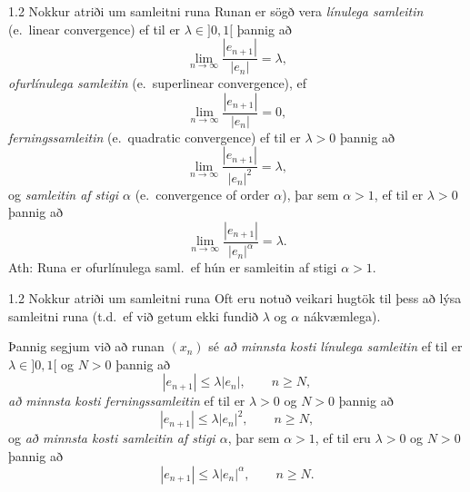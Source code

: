 %
\begin{frame}{1.2 Nokkur atriði um samleitni runa} 
Runan er sögð vera {\it  línulega samleitin} (e.~linear convergence) ef til er $\lambda\in ]0,1[$ þannig að
\begin{equation*}
	\lim_{n\to \infty}\dfrac{|e_{n+1}|}{|e_n|}=\lambda,
\end{equation*}\pause
{\it ofurlínulega samleitin} (e.~superlinear convergence), ef 
\begin{equation*}
	\lim_{n\to \infty}\dfrac{|e_{n+1}|}{|e_n|}=0,
\end{equation*}\pause
{\it ferningssamleitin} (e.~quadratic convergence) ef til er $\lambda>0$ þannig að
\begin{equation*}
	\lim_{n\to \infty}\dfrac{|e_{n+1}|}{|e_n|^2}=\lambda,
\end{equation*}\pause
og {\it samleitin af stigi $\alpha$} (e.~convergence of order $\alpha$), 
þar sem $\alpha> 1$, 
ef til er $\lambda>0$ þannig að
\begin{equation*}
	\lim_{n\to \infty}\dfrac{|e_{n+1}|}{|e_n|^\alpha}=\lambda.
\end{equation*}
\pause
Ath: Runa er ofurlínulega saml.~ef hún er samleitin af
stigi $\alpha>1$.
\end{frame}
%
%
\begin{frame}{1.2 Nokkur atriði um samleitni runa} 
Oft eru notuð veikari hugtök til þess að lýsa samleitni runa
(t.d.~ef við getum ekki fundið $\lambda$ og $\alpha$ nákvæmlega). \pause

\smallskip

Þannig segjum við að runan $(x_n)$ sé  
{\it að minnsta kosti línulega samleitin} ef til er 
$\lambda\in ]0,1[$ og $N >0$ þannig að 
\begin{equation*}
	|e_{n+1}|\leq \lambda |e_n|, \qquad n\geq N,
\end{equation*}\pause
{\it að minnsta kosti ferningssamleitin} ef til er $\lambda>0$ og $N>0$ þannig að
\begin{equation*}
	|e_{n+1}|\leq \lambda |e_n|^2, \qquad n\geq N,
\end{equation*}\pause
og  {\it að minnsta kosti samleitin af stigi $\alpha$}, þar sem $\alpha> 1$, ef til eru $\lambda>0$ og $N>0$ þannig að
\begin{equation*}
	|e_{n+1}|\leq \lambda |e_n|^\alpha, \qquad n\geq N.
\end{equation*}
\end{frame}

